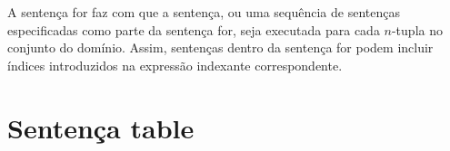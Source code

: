 \documentclass[11pt, brazil]{report}
\def\para#1{\noindent{\bf#1}}
\begin{document}
A sentença for faz com que a sentença, ou uma sequência de sentenças
especificadas como parte da sentença for, seja executada para cada
$n$-tupla no conjunto do domínio. Assim, sentenças dentro da sentença for
podem incluir índices introduzidos na expressão indexante correspondente.

%
%
%
%
%
%
%
%
%
%

\newpage

\section{Sentença table}

\noindent
{}
\end{document}
